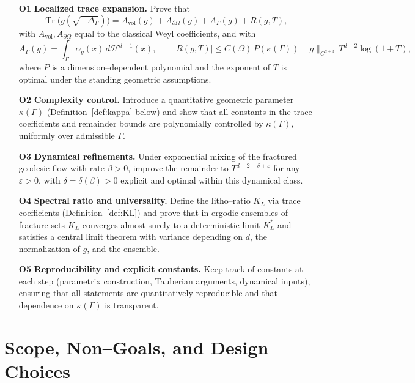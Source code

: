 \begin{itemize}
  \item[\textbf{O1}] \textbf{Localized trace expansion.}  
  Prove that
  \[
     \operatorname{Tr}\big(g(\sqrt{-\Delta_\Gamma})\big)
      = A_{\mathrm{vol}}(g)+A_{\partial\Omega}(g)+A_\Gamma(g)+R(g,T),
  \]
  with $A_{\mathrm{vol}},A_{\partial\Omega}$ equal to the classical Weyl 
  coefficients, and with
  \[
  A_\Gamma(g)=\int_\Gamma \alpha_g(x)\,d\mathcal H^{d-1}(x),
  \qquad 
  |R(g,T)|\le C(\Omega)\,P(\kappa(\Gamma))\,\|g\|_{C^{d+3}}\,T^{d-2}\log(1+T),
  \]
  where $P$ is a dimension–dependent polynomial and the exponent of $T$ is 
  optimal under the standing geometric assumptions.

  \item[\textbf{O2}] \textbf{Complexity control.}  
  Introduce a quantitative geometric parameter $\kappa(\Gamma)$ 
  (Definition~\ref{def:kappa} below) and show that all constants in the trace 
  coefficients and remainder bounds are polynomially controlled by 
  $\kappa(\Gamma)$, uniformly over admissible $\Gamma$.

  \item[\textbf{O3}] \textbf{Dynamical refinements.}  
  Under exponential mixing of the fractured geodesic flow with rate $\beta>0$, 
  improve the remainder to $T^{d-2-\delta+\varepsilon}$ for any $\varepsilon>0$, 
  with $\delta=\delta(\beta)>0$ explicit and optimal within this dynamical 
  class.

  \item[\textbf{O4}] \textbf{Spectral ratio and universality.}  
  Define the litho–ratio $K_L$ via trace coefficients (Definition~\ref{def:KL}) 
  and prove that in ergodic ensembles of fracture sets $K_L$ converges almost 
  surely to a deterministic limit $K_L^\ast$ and satisfies a central limit 
  theorem with variance depending on $d$, the normalization of $g$, and the 
  ensemble.

  \item[\textbf{O5}] \textbf{Reproducibility and explicit constants.}  
  Keep track of constants at each step (parametrix construction, Tauberian 
  arguments, dynamical inputs), ensuring that all statements are quantitatively 
  reproducible and that dependence on $\kappa(\Gamma)$ is transparent.
\end{itemize}

\section{Scope, Non–Goals, and Design Choices}

